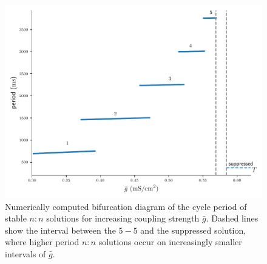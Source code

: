 \documentclass[utf8]{frontiersFPHY} %
\newcommand{\gbar}{\bar g}
\begin{document}
\begin{figure}[h!]
  \centering
  \includegraphics{bif-diagram}
  \caption{Numerically computed bifurcation diagram of the cycle period of stable $n:n$ solutions for increasing coupling strength $\gbar$. Dashed lines show the interval between the $5-5$ and the suppressed solution, where higher period $n:n$ solutions occur on increasingly smaller intervals of $\gbar$.\label{fig:bif-diagram}}
\end{figure}
\end{document}
